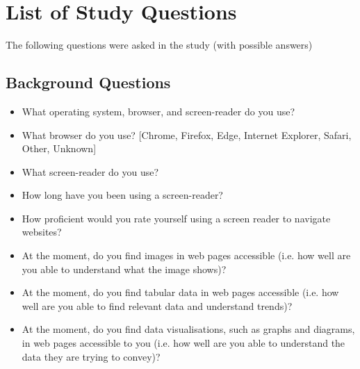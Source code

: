 \documentclass[ %
                    author={Aleena Baig},
                supervisor={Dr Simon Lock},
                    degree={BSc},
                     title={On Making Web Accessible Graphs},
                  subtitle={},
                      year={2019} ]{dissertation}
\begin{document}
\chapter{List of Study Questions}
\label{appendix:listofqs}

The following questions were asked in the study (with possible answers)

\section{Background Questions}

\begin{itemize}
    \item What operating system, browser, and screen-reader do you use? 
    \item What browser do you use? [Chrome, Firefox, Edge, Internet Explorer, Safari, Other, Unknown]
    \item What screen-reader do you use? 
    \item How long have you been using a screen-reader? 
    \item How proficient would you rate yourself using a screen reader to navigate websites? 
    \item At the moment, do you find images in web pages accessible (i.e. how well are you able to understand what the image shows)? 
    \item At the moment, do you find tabular data in web pages accessible (i.e. how well are you able to find relevant data and understand trends)? 
    \item At the moment, do you find data visualisations, such as graphs and diagrams, in web pages accessible to you (i.e. how well are you able to understand the data they are trying to convey)? 
\end{itemize}
\end{document}
